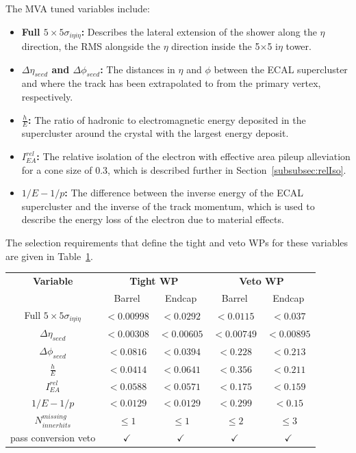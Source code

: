 The MVA tuned variables include:
\begin{itemize}
\item \textbf{Full $5 \times 5 \sigma_{i\eta i\eta}$:} Describes the lateral extension of the shower along the $\eta$ direction, \ie the RMS alongside the $\eta$ direction inside the 5$\times$5 i$\eta$ tower.
\item \textbf{$\Delta \eta_{seed}$ and $\Delta \phi_{seed}$:} The distances in $\eta$ and $\phi$ between the ECAL supercluster and where the track has been extrapolated to from the primary vertex, respectively.
\item \textbf{$\frac{h}{E}$:} The ratio of hadronic to electromagnetic energy deposited in the supercluster around the crystal with the largest energy deposit.
\item \textbf{$I^{rel}_{EA}$:} The relative isolation of the electron with effective area pileup alleviation for a cone size of 0.3, which is described further in Section~\ref{subsubsec:relIso}.
\item \textbf{$1/E - 1/p$:} The difference between the inverse energy of the ECAL supercluster and the inverse of the track momentum, which is used to describe the energy loss of the electron due to material effects.
\end{itemize}

The selection requirements that define the tight and veto WPs for these variables are given in Table~\ref{tab:electronCuts}.

\begin{table}[htbp]
\label{tab:electronCuts}
  \centering
 \begin{tabular}{ccccc}
   \hline
   \textbf{Variable} & \multicolumn{2}{c}{\textbf{Tight WP}} & \multicolumn{2}{c}{\textbf{Veto WP}}   \\
    & Barrel & Endcap & Barrel & Endcap \\
    \hline   
    Full $5\times5 \sigma_{i\eta i\eta}$ & $< 0.00998$ & $< 0.0292$ & $< 0.0115$ & $< 0.037$ \\
    $\Delta \eta_{seed}$ & $<0.00308$ & $<0.00605$ & $<0.00749$ & $<0.00895$ \\
    $\Delta \phi_{seed}$ & $<0.0816$ & $<0.0394$ & $<0.228$ & $<0.213$ \\
    $\frac{h}{E}$ & $<0.0414$ & $<0.0641$ & $<0.356$ & $<0.211$	\\
    $I^{rel}_{EA}$ & $<0.0588$ & $<0.0571$ & $<0.175$ & $<0.159$ \\
    $1/E - 1/p$ & $<0.0129$ & $<0.0129$ & $<0.299$ & $<0.15$ \\
    $N^{missing}_{inner hits}$ & $\leq 1$ & $\leq 1$ & $\leq 2$ & $\leq 3$ \\
    pass conversion veto & $\checkmark$ & $\checkmark$ & $\checkmark$ & $\checkmark$ \\
    \hline
 \end{tabular}%
\end{table}

